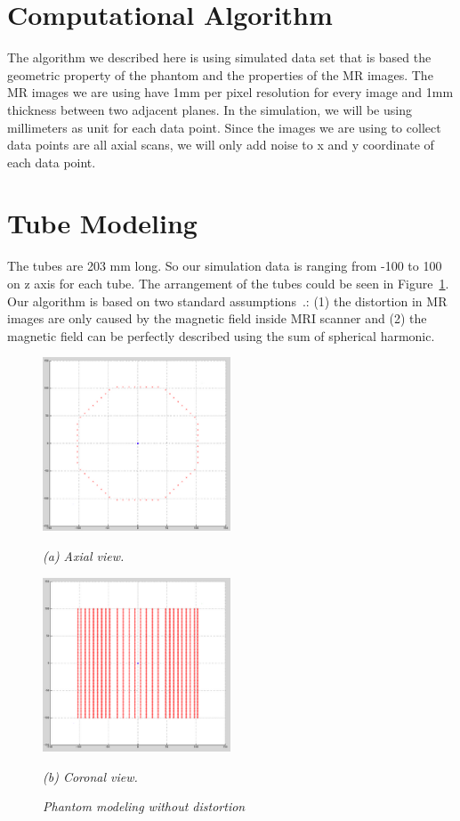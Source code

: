 \section{Computational Algorithm}

The algorithm we described here is using simulated data set that is based the
geometric property of the phantom and the properties of the MR images.
The MR images we are using have 1mm per pixel resolution for every image and
1mm thickness between two adjacent planes. In the simulation, we will be using millimeters as unit for
each data point. Since the images we are using to collect data points are all axial scans,
we will only add noise to x and y coordinate of each data point.

\section{Tube Modeling}

The tubes are 203 mm long. So our simulation data is ranging from -100 to 100 on z axis for each tube.
The arrangement of the tubes could be seen in Figure~\ref{fig:1}.
Our algorithm is based on two standard assumptions~\cite{LSS06a,LSS06b,LSS08a,tlee_iaeng,simple_approach}.: (1) the distortion in MR images are only caused by the magnetic field inside MRI scanner and (2) the magnetic field can be perfectly described using the sum of spherical harmonic.

\begin{figure}[htb]

  \begin{minipage}[b]{2.2in}
    \centering
    \centerline{\mbox{\includegraphics[width=2.2in]{isocenter/images/simulation/axial_no_distortion.eps}}}
    \centerline{\emph{(a) Axial view.}}
  \end{minipage}
  \hfill
  \begin{minipage}[b]{2.2in}
    \centering
    \centerline{\mbox{\includegraphics[width=2.2in]{isocenter/images/simulation/coronal_no_distortion.eps}}}
    \centerline{\emph{(b) Coronal view.}}
  \end{minipage}
%
\caption{\emph{Phantom modeling without distortion}} \label{fig:1}
%
\end{figure}

